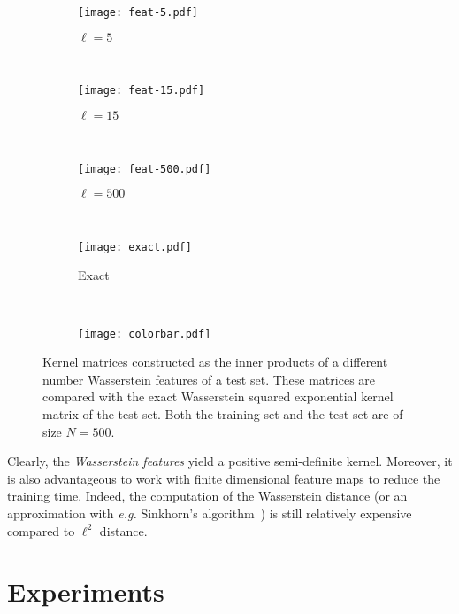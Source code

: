 \begin{figure*}[h!]
    \centering
    \begin{subfigure}[t]{0.20\textwidth}
        \centering
        \texttt{[image: feat-5.pdf]}
        \caption{$\ell =5$}
    \end{subfigure}%
    ~ 
    \begin{subfigure}[t]{0.20\textwidth}
        \centering
        \texttt{[image: feat-15.pdf]}
        \caption{$\ell=15$}
    \end{subfigure}%
    ~ 
    \begin{subfigure}[t]{0.20\textwidth}
        \centering
        \texttt{[image: feat-500.pdf]}
        \caption{$\ell=500$}
    \end{subfigure}%
    ~ 
    \begin{subfigure}[t]{0.20\textwidth}
        \centering
        \texttt{[image: exact.pdf]}
        \caption{Exact}
    \end{subfigure}
    ~
    \begin{subfigure}[t]{0.053\textwidth}
        \centering
        \texttt{[image: colorbar.pdf]}
    \end{subfigure}
    \caption[Reconstruction with Wasserstein features.]{Kernel matrices constructed as the inner products of a different number Wasserstein features of a test set. These matrices are compared with the exact Wasserstein squared exponential kernel matrix of the test set. Both the training set and the test set are of size $N=500$.}
    \label{wass-features}
\end{figure*}

Clearly, the \emph{Wasserstein features} yield a positive semi-definite kernel. Moreover, it is also advantageous to work with finite dimensional feature maps to reduce the training time. Indeed, the computation of the Wasserstein distance (or an approximation with \emph{e.g.} Sinkhorn's algorithm~\cite{Lightspeed}) is still relatively expensive compared to $\ell^2$ distance. 

\section{Experiments}

